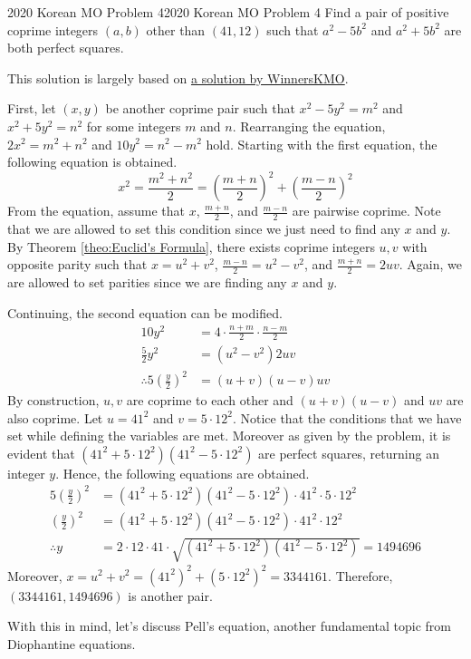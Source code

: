 \documentclass[../../../main.tex]{subfiles}
\begin{document}
\begin{problem}{2020 Korean MO Problem 4}{2020 Korean MO Problem 4}
Find a pair of positive coprime integers $(a, b)$ other than
$(41, 12)$ such that $a^2 - 5b^2$ and $a^2 + 5b^2$ are both perfect
squares.
\end{problem}
This solution is largely based on
\href{https://youtu.be/4eetdspSRYw?si=U1hylcoUzUwPA66a}{a solution by WinnersKMO}.
\begin{solution}
First, let $(x, y)$ be another coprime pair such that
$x^2 - 5y^2 = m^2$ and $x^2 + 5y^2 = n^2$ for some integers
$m$ and $n$. Rearranging the equation, $2x^2 = m^2 + n^2$ and
$10y^2 = n^2 - m^2$ hold. Starting with the first equation,
the following equation is obtained.
\[
x^2
= \frac{m^2 + n^2}{2}
= \left( \frac{m + n}{2} \right)^2 + \left( \frac{m - n}{2} \right)^2
\]
From the equation, assume that $x$, $\frac{m + n}{2}$, and
$\frac{m - n}{2}$ are pairwise coprime. Note that we are allowed
to set this condition since we just need to find any $x$ and $y$.
By Theorem \ref{theo:Euclid's Formula}, there exists coprime
integers $u, v$ with opposite parity such that $x = u^2 + v^2$,
$\frac{m - n}{2} = u^2 - v^2$, and $\frac{m + n}{2} = 2uv$.
Again, we are allowed to set parities since we are finding any
$x$ and $y$.

Continuing, the second equation can be modified.
\begin{align*}
    10y^2
    &= 4 \cdot \frac{n + m}{2} \cdot \frac{n - m}{2} \\
    \frac{5}{2} y^2
    &= (u^2 - v^2) 2uv \\
    \therefore
    5 \left( \frac{y}{2} \right)^2
    &= (u + v)(u - v) uv
\end{align*}
By construction, $u, v$ are coprime to each other and $(u + v)(u - v)$
and $uv$ are also coprime. Let $u = 41^2$ and $v = 5 \cdot 12^2$.
Notice that the conditions that we have set while defining the
variables are met. Moreover as given by the problem, it is evident
that $(41^2 + 5 \cdot 12^2)(41^2 - 5 \cdot 12^2)$ are perfect
squares, returning an integer $y$. Hence, the following equations
are obtained.
\begin{align*}
    5 \left( \frac{y}{2} \right)^2
    &= (41^2 + 5 \cdot 12^2)(41^2 - 5 \cdot 12^2)
        \cdot 41^2 \cdot 5 \cdot 12^2 \\
    \left( \frac{y}{2} \right)^2
    &= (41^2 + 5 \cdot 12^2)(41^2 - 5 \cdot 12^2)
        \cdot 41^2 \cdot 12^2 \\
    \therefore y
    &= 2 \cdot 12 \cdot 41 \cdot
        \sqrt{(41^2 + 5 \cdot 12^2)(41^2 - 5 \cdot 12^2)}
    = 1494696
\end{align*}
Moreover, $x = u^2 + v^2 = \left(41^2\right)^2 +
\left(5 \cdot 12^2\right)^2 = 3344161$. Therefore,
$(3344161, 1494696)$ is another pair.
\end{solution}

With this in mind, let's discuss Pell's equation, another fundamental
topic from Diophantine equations.
\end{document}
